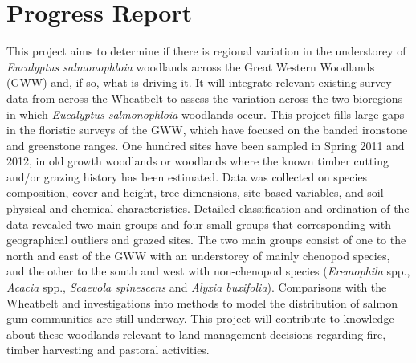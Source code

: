 \documentclass[version=last, paper=a4, DIV=18, usenames, dvipsnames]{scrartcl}
\begin{document}
\section{Progress Report}



This project aims to determine if there is regional variation in the understorey of \emph{Eucalyptus salmonophloia} woodlands across the Great Western Woodlands (GWW) and, if so, what is driving it. It will integrate relevant existing survey data from across the Wheatbelt to assess the variation across the two bioregions in which \emph{Eucalyptus salmonophloia} woodlands occur. This project fills large gaps in the floristic surveys of the GWW, which have focused on the banded ironstone and greenstone ranges. One hundred sites have been sampled in Spring 2011 and 2012, in old growth woodlands or woodlands where the known timber cutting and/or grazing history has been estimated. Data was collected on species composition, cover and height, tree dimensions, site-based variables, and soil physical and chemical characteristics. Detailed classification and ordination of the data revealed two main groups and four small groups that corresponding with geographical outliers and grazed sites. The two main groups consist of one to the north and east of the GWW with an understorey of mainly chenopod species, and the other to the south and west with non-chenopod species (\emph{Eremophila} spp., \emph{Acacia} spp., \emph{Scaevola spinescens} and \emph{Alyxia buxifolia}). Comparisons with the Wheatbelt and investigations into methods to model the distribution of salmon gum communities are still underway. This project will contribute to knowledge about these woodlands relevant to land management decisions regarding fire, timber harvesting and pastoral activities.






\clearpage
\end{document}
